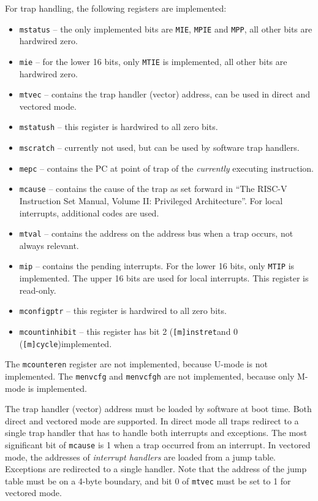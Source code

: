 \documentclass[12pt]{article}
\begin{document}
For trap handling, the following registers are implemented:

\begin{itemize}
\item \lstinline|mstatus| -- the only implemented bits are \lstinline|MIE|, \lstinline|MPIE| and \lstinline|MPP|, all other bits are hardwired zero.
\item \lstinline|mie| -- for the lower 16 bits, only \lstinline|MTIE| is implemented, all other bits are hardwired zero.
\item \lstinline|mtvec| -- contains the trap handler (vector) address, can be used in direct and vectored mode.
\item \lstinline|mstatush| -- this register is hardwired to all zero bits.
\item \lstinline|mscratch| -- currently not used, but can be used by software trap handlers.
\item \lstinline|mepc| -- contains the PC at point of trap of the \emph{currently} executing instruction.
\item \lstinline|mcause| -- contains the cause of the trap as set forward in ``The RISC-V Instruction Set Manual, Volume II: Privileged Architecture''. For local interrupts, additional codes are used.
\item \lstinline|mtval| -- contains the address on the address bus when a trap occurs, not always relevant.
\item \lstinline|mip| -- contains the pending interrupts. For the lower 16 bits, only \lstinline|MTIP| is implemented. The upper 16 bits are used for local interrupts. This register is read-only.
\item \lstinline|mconfigptr| -- this register is hardwired to all zero bits.
\item \lstinline|mcountinhibit| -- this register has bit 2 (\lstinline|[m]instret|and 0 (\lstinline|[m]cycle|)implemented.
\end{itemize}

The \lstinline|mcounteren| register are not implemented, because U-mode is not implemented. The \lstinline|menvcfg| and \lstinline|menvcfgh| are not implemented, because only M-mode is implemented.

The trap handler (vector) address must be loaded by software at boot time. Both direct and vectored mode are supported. In direct mode all traps redirect to a single trap handler that has to handle both interrupts and exceptions. The most significant bit of \lstinline|mcause| is 1 when a trap occurred from an interrupt. In vectored mode, the addresses of \emph{interrupt handlers} are loaded from a jump table. Exceptions are redirected to a single handler. Note that the address of the jump table must be on a 4-byte boundary, and bit 0 of \lstinline|mtvec| must be set to 1 for vectored mode.
\end{document}
